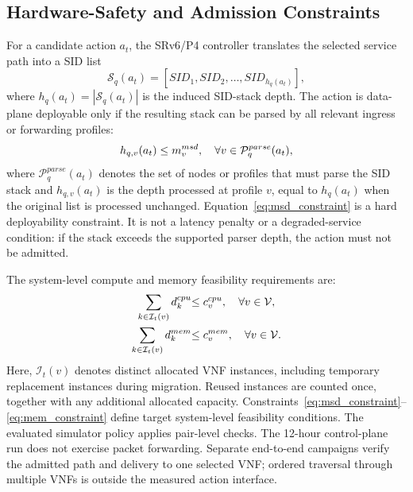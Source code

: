 \documentclass[final,5p]{elsarticle}
\newcommand{\rev}[1]{\textcolor{revisiongreen}{#1}}
\begin{document}
\subsection{Hardware-Safety and Admission Constraints}
\label{subsec:hardware_constraint_model}

For a candidate action \(a_t\), the SRv6/P4 controller translates the selected service path into a SID list
\begin{equation}
\mathcal{S}_q(a_t)=[SID_1,SID_2,\ldots,SID_{h_q(a_t)}],
\end{equation}
where \(h_q(a_t)=|\mathcal{S}_q(a_t)|\) is the induced SID-stack depth. The action is data-plane deployable only if the resulting stack can be parsed by all relevant ingress or forwarding profiles:
\begin{equation}
\rev{h_{q,v}(a_t)\le m_v^{msd},\quad\forall v\in\mathcal{P}^{parse}_q(a_t),}
\label{eq:msd_constraint}
\end{equation}
where \(\mathcal{P}^{parse}_q(a_t)\) denotes the set of nodes or profiles that must parse the SID stack \rev{and \(h_{q,v}(a_t)\) is the depth processed at profile \(v\), equal to \(h_q(a_t)\) when the original list is processed unchanged}. Equation~\eqref{eq:msd_constraint} is a hard deployability constraint. It is not a latency penalty or a degraded-service condition: if the stack exceeds the supported parser depth, the action must not be admitted.

The system-level compute and memory feasibility requirements are:
\begin{align}
\rev{\sum_{k\in\mathcal{I}_t(v)}d_k^{cpu}}&\rev{\le c_v^{cpu},\quad\forall v\in\mathcal{V},}\label{eq:cpu_constraint}\\
\rev{\sum_{k\in\mathcal{I}_t(v)}d_k^{mem}}&\rev{\le c_v^{mem},\quad\forall v\in\mathcal{V}.}\label{eq:mem_constraint}
\end{align}
\rev{Here, \(\mathcal{I}_t(v)\) denotes distinct allocated VNF instances, including temporary replacement instances during migration. Reused instances are counted once, together with any additional allocated capacity.} Constraints~\eqref{eq:msd_constraint}--\eqref{eq:mem_constraint} define target system-level feasibility conditions. The evaluated simulator policy applies pair-level checks. The 12-hour control-plane run does not exercise packet forwarding. Separate end-to-end campaigns verify the admitted path and delivery to one selected VNF; ordered traversal through multiple VNFs is outside the measured action interface.
\end{document}
